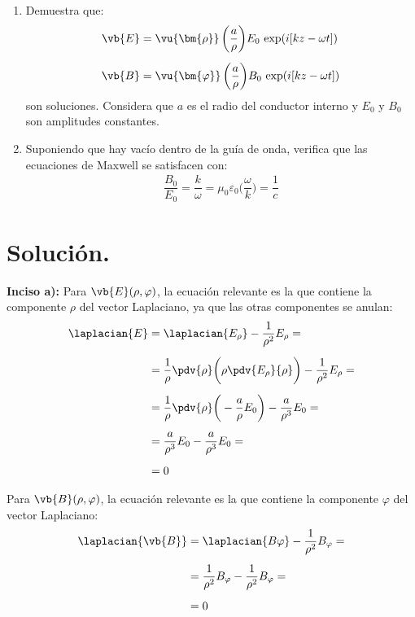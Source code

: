 \begin{enumerate}[label=\alph*)]
\item Demuestra que:
\begin{align*}
\vb{E} &= \vu{\bm{\rho}} \, \bigg( \dfrac{a}{\rho} \bigg) E_{0} \, \exp(i [k z - \omega t]) \\[0.5em]
\vb{B} &= \vu{\bm{\varphi}} \, \bigg( \dfrac{a}{\rho} \bigg) B_{0} \, \exp(i [k z - \omega t])
\end{align*}
son soluciones. Considera que $a$ es el radio del conductor interno y $E_{0}$ y $B_{0}$ son amplitudes constantes.
\item Suponiendo que hay vacío dentro de la guía de onda, verifica que las ecuaciones de Maxwell se satisfacen con:
\begin{align*}
\dfrac{B_{0}}{E_{0}} = \dfrac{k}{\omega} = \mu_{0} \varepsilon_{0} \bigg( \dfrac{\omega}{k} \bigg) = \dfrac{1}{c}
\end{align*}
\end{enumerate}

\section{Solución.}

\noindent
\textbf{Inciso a):} Para $\vb{E} (\rho, \varphi)$, la ecuación relevante es la que contiene la componente $\rho$ del vector Laplaciano, ya que las otras componentes se anulan:
\begin{align*}
\laplacian{E} &= \laplacian{E_{\rho}} - \dfrac{1}{\rho^{2}} E_{\rho} = \\[0.5em]
&= \dfrac{1}{\rho} \pdv{\rho} \bigg( \rho \pdv{E_{\rho}}{\rho} \bigg) - \dfrac{1}{\rho^{2}} E_{\rho} = \\[0.5em]
&= \dfrac{1}{\rho} \pdv{\rho} \bigg( - \dfrac{a}{\rho} E_{0} \bigg) - \dfrac{a}{\rho^{3}} E_{0} = \\[0.5em]
&= \dfrac{a}{\rho^{3}} E_{0} - \dfrac{a}{\rho^{3}} E_{0} = \\[0.5em]
&= 0
\end{align*}

Para $\vb{B} (\rho, \varphi)$, la ecuación relevante es la que contiene la componente $\varphi$ del vector Laplaciano:
\begin{align*}
\laplacian{\vb{B}} &= \laplacian{B_{}\varphi} - \dfrac{1}{\rho^{2}} B_{\varphi} = \\[0.5em]
&= \dfrac{1}{\rho^{2}} B_{\varphi} - \dfrac{1}{\rho^{2}} B_{\varphi} = \\[0.5em]
&= 0
\end{align*}

